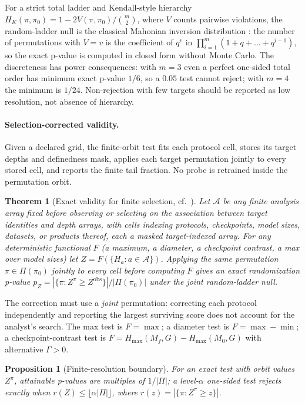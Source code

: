 \documentclass[11pt]{article}
\newtheorem{theorem}{Theorem}
\newtheorem{proposition}{Proposition}
\begin{document}
For a strict total ladder and Kendall-style hierarchy $H_K(\pi,\pi_0)=1-2V(\pi,\pi_0)/\binom{m}{2}$, where $V$ counts pairwise violations, the random-ladder null is the classical Mahonian inversion distribution \citep{macmahon1915combinatory,stanley2011enumerative}: the number of permutations with $V=v$ is the coefficient of $q^v$ in $\prod_{i=1}^m(1+q+\dots+q^{i-1})$, so the exact p-value is computed in closed form without Monte Carlo. The discreteness has power consequences: with $m=3$ even a perfect one-sided total order has minimum exact p-value $1/6$, so a $0.05$ test cannot reject; with $m=4$ the minimum is $1/24$. Non-rejection with few targets should be reported as low resolution, not absence of hierarchy.

\paragraph{Selection-corrected validity.} Given a declared grid, the finite-orbit test fits each protocol cell, stores its target depths and definedness mask, applies each target permutation jointly to every stored cell, and reports the finite tail fraction. No probe is retrained inside the permutation orbit.

\begin{theorem}[Exact validity for finite selection, cf.\ \citealp{fisher1935design,westfallyoung1993resampling}]
\label{thm:validity}
Let $\mathcal{A}$ be any finite analysis array fixed before observing or selecting on the association between target identities and depth arrays, with cells indexing protocols, checkpoints, model sizes, datasets, or products thereof, each a masked target-indexed array. For any deterministic functional $F$ (a maximum, a diameter, a checkpoint contrast, a max over model sizes) let $Z=F(\{H_a:a\in\mathcal{A}\})$. Applying the same permutation $\pi\in\Pi(\pi_0)$ jointly to every cell before computing $F$ gives an exact randomization p-value $p_Z=|\{\pi:Z^\pi\ge Z^{\mathrm{obs}}\}|/|\Pi(\pi_0)|$ under the joint random-ladder null.
\end{theorem}

The correction must use a \emph{joint} permutation: correcting each protocol independently and reporting the largest surviving score does not account for the analyst's search. The max test is $F=\max$; a diameter test is $F=\max-\min$; a checkpoint-contrast test is $F=H_{\max}(M_f,G)-H_{\max}(M_0,G)$ with alternative $\Gamma>0$.

\begin{proposition}[Finite-resolution boundary]
\label{prop:resolution}
For an exact test with orbit values $Z^\pi$, attainable p-values are multiples of $1/|\Pi|$; a level-$\alpha$ one-sided test rejects exactly when $r(Z)\le\lfloor\alpha|\Pi|\rfloor$, where $r(z)=|\{\pi:Z^\pi\ge z\}|$.
\end{proposition}
\end{document}
